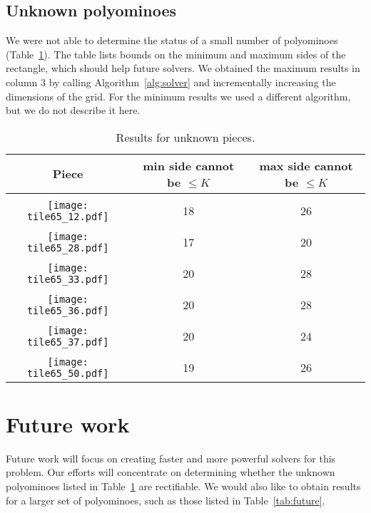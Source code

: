 \documentclass[10pt,a4paper]{article}
\theoremstyle{definition}
\begin{document}
\pagebreak
\subsection{Unknown polyominoes}

We were not able to determine the status of a small number of polyominoes (Table~\ref{tab:unknown}).
The table lists bounds on the minimum and maximum sides of the rectangle, which
should help future solvers. We obtained the maximum results in column 3 by calling Algorithm~\ref{alg:solver} and
incrementally increasing the dimensions of the grid. For the minimum results we used a different algorithm,
but we do not describe it here.

\begin{table}[h]
\centering
\begin{tabular}{|c|c|c|}
\hline
Piece & min side cannot be $\leq K$ & max side cannot be $\leq K$ \\ \hline
  & & \\ 
\texttt{[image: tile65\_12.pdf]} & 18 & 26 \\ \hline
  & & \\ 
\texttt{[image: tile65\_28.pdf]} & 17 & 20 \\ \hline
  & & \\ 
\texttt{[image: tile65\_33.pdf]} & 20 & 28 \\ \hline
  & & \\ 
\texttt{[image: tile65\_36.pdf]} & 20 & 28 \\ \hline
  & & \\ 
\texttt{[image: tile65\_37.pdf]} & 20 & 24 \\ \hline
  & & \\ 
\texttt{[image: tile65\_50.pdf]} & 19 & 26 \\ \hline
\end{tabular}
\caption{Results for unknown pieces.}
\label{tab:unknown}
\end{table}




\section{Future work}

Future work will focus on creating faster and more powerful solvers for this problem. Our efforts will concentrate on
determining whether the unknown polyominoes listed in Table~\ref{tab:unknown} are rectifiable. We would also like to obtain
results for a larger set of polyominoes, such as those listed in Table~\ref{tab:future}.
\end{document}

